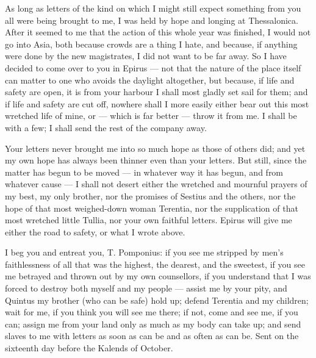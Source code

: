 

 As long as letters of the kind on which I might still expect something from you all were being brought to me, I was held by hope and longing at Thessalonica. After it seemed to me that the action of this whole year was finished, I would not go into Asia, both because crowds are a thing I hate, and because, if anything were done by the new magistrates, I did not want to be far away. So I have decided to come over to you in Epirus --- not that the nature of the place itself can matter to one who avoids the daylight altogether, but because, if life and safety are open, it is from your harbour I shall most gladly set sail for them; and if life and safety are cut off, nowhere shall I more easily either bear out this most wretched life of mine, or --- which is far better --- throw it from me. I shall be with a few; I shall send the rest of the company away.

 Your letters never brought me into so much hope as those of others did; and yet my own hope has always been thinner even than your letters. But still, since the matter has begun to be moved --- in whatever way it has begun, and from whatever cause --- I shall not desert either the wretched and mournful prayers of my best, my only brother, nor the promises of Sestius and the others, nor the hope of that most weighed-down woman Terentia, nor the supplication of that most wretched little Tullia, nor your own faithful letters. Epirus will give me either the road to safety, or what I wrote above.

 I beg you and entreat you, T. Pomponius: if you see me stripped by men's faithlessness of all that was the highest, the dearest, and the sweetest, if you see me betrayed and thrown out by my own counsellors, if you understand that I was forced to destroy both myself and my people --- assist me by your pity, and Quintus my brother (who can be safe) hold up; defend Terentia and my children; wait for me, if you think you will see me there; if not, come and see me, if you can; assign me from your land only as much as my body can take up; and send slaves to me with letters as soon as can be and as often as can be. Sent on the sixteenth day before the Kalends of October.
